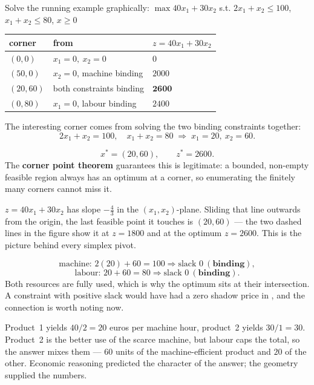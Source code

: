 \begin{worked}{Solve the running example graphically: $\max 40x_{1}+30x_{2}$ s.t. $2x_{1}+x_{2}\le100$, $x_{1}+x_{2}\le80$, $x\ge0$}
\begin{center}\footnotesize
\begin{tabular}{lll}
  \hline
  corner & from & $z=40x_{1}+30x_{2}$\\
  \hline
  $(0,0)$ & $x_{1}=0,\ x_{2}=0$ & $0$\\
  $(50,0)$ & $x_{2}=0$, machine binding & $2000$\\
  $(20,60)$ & both constraints binding & $\mathbf{2600}$\\
  $(0,80)$ & $x_{1}=0$, labour binding & $2400$\\
  \hline
\end{tabular}
\end{center}
The interesting corner comes from solving the two binding constraints
together:
\[
  2x_{1}+x_{2}=100,\quad x_{1}+x_{2}=80
  \;\Longrightarrow\;
  x_{1}=20,\ x_{2}=60 .
\]

\[
  \boxed{x^{*}=(20,60),\qquad z^{*}=2600 .}
\]
The \textbf{corner point theorem} guarantees this is legitimate: a bounded,
non-empty feasible region always has an optimum at a corner, so enumerating
the finitely many corners cannot miss it.

$z=40x_{1}+30x_{2}$ has slope $-\tfrac43$ in the $(x_{1},x_{2})$-plane.
Sliding that line outwards from the origin, the last feasible point it
touches is $(20,60)$ --- the two dashed lines in the figure show it at
$z=1800$ and at the optimum $z=2600$. This is the picture behind every
simplex pivot.

\[
  \text{machine: }2(20)+60=100 \Rightarrow \text{slack }0\ (\textbf{binding}),
\]
\[
  \text{labour: }20+60=80 \Rightarrow \text{slack }0\ (\textbf{binding}).
\]
Both resources are fully used, which is why the optimum sits at their
intersection. A constraint with positive slack would have had a zero shadow
price in , and the connection is worth noting now.

Product~1 yields $40/2=20$ euros per machine hour, product~2 yields $30/1=30$.
Product~2 is the better use of the scarce machine, but labour caps the
total, so the answer mixes them --- $60$ units of the machine-efficient
product and $20$ of the other. Economic reasoning predicted the character of
the answer; the geometry supplied the numbers.
\end{worked}

